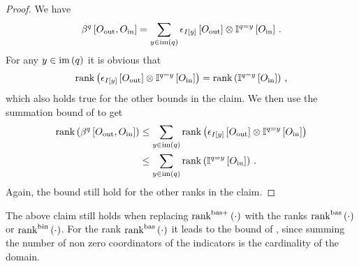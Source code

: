 \begin{proof}
    We have
    \begin{align*}
        \bencodingofat{\exfunction}{\indvariableof{\outsymbol},\indvariableof{\insymbol}}
        = \sum_{\exfunctionimageelement\in\imageof{\exfunction}} \onehotmapofat{\indexinterpretationat{\exfunctionimageelement}}{\indvariableof{\outsymbol}}
        \otimes \onesofat{\exfunction=\exfunctionimageelement}{\indvariableof{\insymbol}} \, .
    \end{align*}
    For any $y\in\mathrm{im}\left(q\right)$ it is obvious that
    \begin{align*}
        \mathrm{rank}\left(\epsilon_{I\left[y\right]}\left[O_{\mathrm{out}}\right]
        \otimes \mathbb{I}^{q=y}\left[O_{\mathrm{in}}\right]\right)
        = \mathrm{rank}\left(\mathbb{I}^{q=y}\left[O_{\mathrm{in}}\right]\right) \, ,
    \end{align*}
    which also holds true for the other bounds in the claim.
    We then use the summation bound of  to get
    \begin{align*}
        \cprankof{\bencodingofat{\exfunction}{\indvariableof{\outsymbol},\indvariableof{\insymbol}}}
        &\leq \sum_{\exfunctionimageelement\in\imageof{\exfunction}} \cprankof{\onehotmapofat{\indexinterpretationat{\exfunctionimageelement}}{\indvariableof{\outsymbol}}
        \otimes \onesofat{\exfunction=\exfunctionimageelement}{\indvariableof{\insymbol}}} \\
        &\leq  \sum_{\exfunctionimageelement\in\imageof{\exfunction}} \cprankof{\onesofat{\exfunction=\exfunctionimageelement}{\indvariableof{\insymbol}}} \, .
    \end{align*}
    Again, the bound still hold for the other ranks in the claim.
\end{proof}

The above claim still holds when replacing $\mathrm{rank}^{\mathrm{bas+}}\left(\cdot\right)$ with the ranks $\mathrm{rank}^{\mathrm{bas}}\left(\cdot\right)$ or $\mathrm{rank}^{\mathrm{bin}}\left(\cdot\right)$.
For the rank $\mathrm{rank}^{\mathrm{bas}}\left(\cdot\right)$ it leads to the bound of , since summing the number of non zero coordinators of the indicators is the cardinality of the domain.

